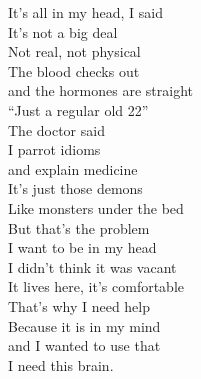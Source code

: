 It's all in my head, I said\\
It's not a big deal\\
Not real, not physical\\
The blood checks out\\
and the hormones are straight\\
``Just a regular old 22''\\
The doctor said\\
I parrot idioms\\
and explain medicine\\
It's just those demons\\
Like monsters under the bed\\

But that's the problem\\
I want to be in my head\\
I didn't think it was vacant\\
It lives here, it's comfortable\\
That's why I need help\\
Because it is in my mind\\
and I wanted to use that\\
I need this brain.\\


